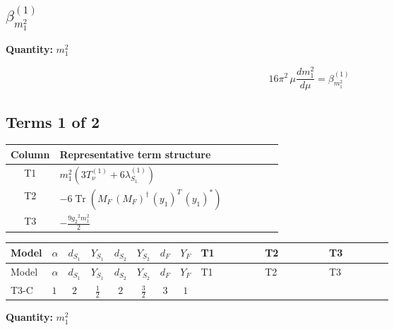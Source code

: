 \documentclass[8pt]{article}
\begin{document}
\begin{landscape}
\section*{$\beta_{m_1^2}^{(1)}$}
\noindent\textbf{Quantity: }$m_1^2$\par\smallskip
\[16\pi^2\,\mu\frac{d m_1^2}{d\mu}=\beta_{m_1^2}^{(1)}\]
\subsection*{Terms 1 of 2}
\begin{center}
\begin{tabular}{@{}c >{\raggedright\arraybackslash}p{0.82\linewidth}@{}}
\toprule
Column & Representative term structure \\
\midrule
T1 & \(\displaystyle {m_1^2} (3 T_{\nu}^{(1)}+6 {\lambda_{S_1}^{(1)}})\) \\
\midrule
T2 & \(\displaystyle -6 \operatorname{Tr}\!\left({M_F}\,\left({M_F}\right)^{\dagger}\,\left({y_1}\right)^{T}\,\left({y_1}\right)^{*}\right)\) \\
\midrule
T3 & \(\displaystyle -\frac{9 {g_2}^2 {m_1^2}}{2}\) \\
\midrule
\bottomrule
\end{tabular}
\end{center}
\smallskip
\tiny
\begin{longtable}{@{}llcccccc >{\raggedright\arraybackslash}p{0.21\linewidth} >{\raggedright\arraybackslash}p{0.21\linewidth} >{\raggedright\arraybackslash}p{0.21\linewidth}@{}}
\toprule
Model & $\alpha$ & $d_{S_1}$ & $Y_{S_1}$ & $d_{S_2}$ & $Y_{S_2}$ & $d_F$ & $Y_F$ & T1 & T2 & T3 \\
\midrule
\endfirsthead
\toprule
Model & $\alpha$ & $d_{S_1}$ & $Y_{S_1}$ & $d_{S_2}$ & $Y_{S_2}$ & $d_F$ & $Y_F$ & T1 & T2 & T3 \\
\midrule
\endhead
T3-C & $1$ & $2$ & $\frac{1}{2}$ & $2$ & $\frac{3}{2}$ & $3$ & $1$ & \scriptsize\adjustbox{max width=\linewidth}{$\begin{gathered} {m_1^2} (3 T_{\nu}^{(1)}+6 {\lambda_{S_1}^{(1)}})\end{gathered}$} & \scriptsize\adjustbox{max width=\linewidth}{$\begin{gathered} -6 \operatorname{Tr}\!\left({M_F}\,\left({M_F}\right)^{\dagger}\,\left({y_1}\right)^{T}\,\left({y_1}\right)^{*}\right)\end{gathered}$} & \scriptsize\adjustbox{max width=\linewidth}{$\begin{gathered} -\frac{9 {g_2}^2 {m_1^2}}{2}\end{gathered}$} \\
\midrule
\bottomrule
\end{longtable}
\clearpage
\noindent\textbf{Quantity: }$m_1^2$\par\smallskip

\end{landscape}
\end{document}
